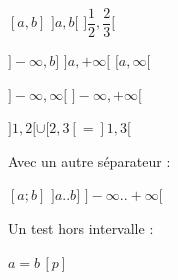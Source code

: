 \documentclass[varwidth, border = 3pt]{standalone}
\begin{document}
$[a, b]$
\quad
$]a, b[$
\quad
$]\dfrac{1}{2}, \dfrac{2}{3}[$

$]-\infty, b]$
\quad
$]a, +\infty[$
\quad
$[a, \infty[$

$]-\infty, \infty[$
\quad
$]-\infty, +\infty[$

$]1, 2[ \cup [2, 3[ = ]1, 3[$


\medskip


Avec un autre séparateur :

$[a ; b]$
\quad
$]a .. b]$
\quad
$]-\infty .. +\infty[$


\medskip


Un test hors intervalle : 

$a = b \, [p]$
\end{document}
